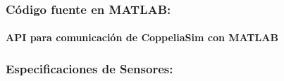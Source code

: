 \documentclass{article}
\begin{document}
\begin{sloppypar}
\subsubsection*{Código fuente en MATLAB:}

\paragraph*{API para comunicación de CoppeliaSim con MATLAB}
\label{sec:API para comunicación de CoppeliaSim con MATLAB}
\hfill

\subsubsection*{Especificaciones de Sensores:}






\end{sloppypar}
\end{document}
